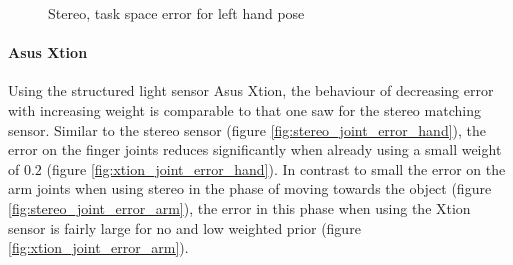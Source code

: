 \begin{figure}
\centering
{}
%
\caption{Stereo, task space error for left hand pose}
\label{fig:stereo_hand_pose_error}
\end{figure}



\paragraph{Asus Xtion}

Using the structured light sensor Asus Xtion, the behaviour of decreasing error with increasing weight is comparable to that one saw for the stereo matching sensor. Similar to the stereo sensor (figure \ref{fig:stereo_joint_error_hand}), the error on the finger joints reduces significantly when already using a small weight of $0.2$ (figure \ref{fig:xtion_joint_error_hand}).
In contrast to small the error on the arm joints when using stereo in the phase of moving towards the object (figure \ref{fig:stereo_joint_error_arm}), the error in this phase when using the Xtion sensor is fairly large for no and low weighted prior (figure \ref{fig:xtion_joint_error_arm}).

